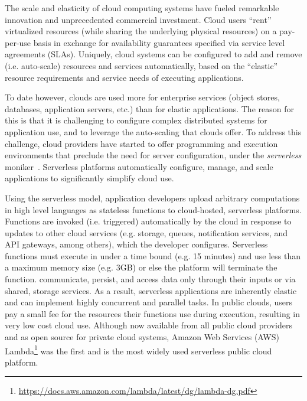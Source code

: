 The scale and elasticity of cloud computing systems have 
fueled remarkable innovation and unprecedented commercial 
investment.  Cloud users ``rent'' virtualized resources (while sharing
the underlying physical resources) on a pay-per-use basis
in exchange for availability guarantees specified via service level
agreements (SLAs). Uniquely, cloud systems can be configured 
to add and remove (i.e. auto-scale) resources and services
automatically, based on the ``elastic'' resource requirements and service needs 
of executing applications.

To date however, clouds are used more for
enterprise services (object stores, databases, application servers, etc.)
than for elastic applications.
The reason for this is that it is challenging to configure complex
distributed systems for application use, 
and to leverage the auto-scaling that
clouds offer. To address this challenge, cloud providers 
have started to offer programming and execution environments
that preclude the need for server configuration,
under the \textit{serverless} moniker~\cite{ref:jonas2017occupy,ref:onesteptwostep,ref:peeking}.  
Serverless platforms automatically configure, manage, and scale applications
to significantly simplify cloud use.

Using the serverless model, application developers upload 
arbitrary computations in high level languages
as stateless functions to cloud-hosted, serverless platforms.
Functions are invoked (i.e. triggered)
automatically by the cloud in response to updates to other cloud services
(e.g. storage, queues, notification services, and API gateways, 
among others), which 
the developer configures. Serverless functions must execute in under
a time bound (e.g. 15 minutes) and use less than a maximum memory size 
(e.g. 3GB) or else the platform will terminate the function.
communicate, persist, and access data only 
through their inputs or via shared, storage services.  
As a result, serverless applications are inherently elastic and can 
implement highly concurrent and parallel tasks.
In public clouds, users pay a small fee for the resources their 
functions use during execution, resulting in very low cost cloud use.
Although now available from all public cloud providers and as open 
source for private cloud systems, 
Amazon Web Services (AWS) Lambda\footnote{\url{https://docs.aws.amazon.com/lambda/latest/dg/lambda-dg.pdf}} %
was the first and is the most widely used
serverless public cloud platform.

